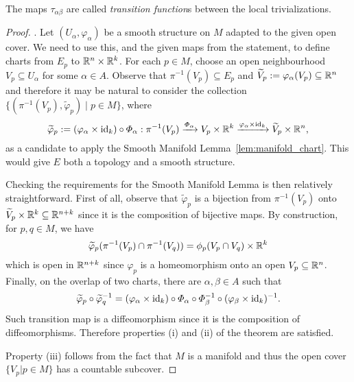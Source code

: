 The maps $\tau_{\alpha\beta}$ are called \emph{transition function}s between the local trivializations.
\begin{proof}
  .
  Let $(U_\alpha, \varphi_\alpha)$ be a smooth structure on $M$ adapted to the given open cover.
  We need to use this, and the given maps from the statement, to define charts from $E_p$ to $\mathbb{R}^n\times\mathbb{R}^k$.
  For each $p\in M$, choose an open neighbourhood $V_p \subseteq U_\alpha$ for some $\alpha\in A$.
  Observe that $\pi^{-1}(V_p) \subseteq E_p$ and $\widetilde{V}_p := \varphi_\alpha(V_p) \subseteq \mathbb{R}^n$ and therefore it may be natural to consider the collection $\{(\pi^{-1}(V_p), \widetilde{\varphi}_p)\mid p\in M\}$, where
  \begin{equation}
    \widetilde{\varphi}_p := (\varphi_\alpha\times \operatorname{id}_k) \circ \varPhi_\alpha : \pi^{-1}(V_p) \xrightarrow{\varPhi_\alpha} V_p\times\mathbb{R}^k \xrightarrow{\varphi_\alpha\times \operatorname{id}_k} \widetilde{V}_p\times \mathbb{R}^n,
  \end{equation}
  as a candidate to apply the Smooth Manifold Lemma~\ref{lem:manifold_chart}.
  This would give $E$ both a topology and a smooth structure.

  Checking the requirements for the Smooth Manifold Lemma is then relatively straightforward.
  First of all, observe that $\widetilde{\varphi}_p$ is a bijection from $\pi^{-1}(V_p)$ onto $\widetilde{V}_p\times\mathbb{R}^k \subseteq \mathbb{R}^{n+k}$ since it is the composition of bijective maps.
  By construction, for $p,q\in M$, we have
  \begin{equation}
    \widetilde{\varphi}_p(\pi^{-1}(V_p) \cap \pi^{-1}(V_q)) = \phi_p(V_p\cap V_q)\times \mathbb{R}^k
  \end{equation}
  which is open in $\mathbb{R}^{n+k}$ since $\varphi_p$ is a homeomorphism onto an open $V_p\subseteq\mathbb{R}^n$.
  Finally, on the overlap of two charts, there are $\alpha, \beta\in A$ such that
  \begin{equation}
    \widetilde{\varphi}_p \circ \widetilde{\varphi}_q^{-1} =
    (\varphi_\alpha \times \operatorname{id}_k) \circ \varPhi_\alpha \circ \varPhi_\beta^{-1} \circ (\varphi_\beta \times \operatorname{id}_k)^{-1}.
  \end{equation}
  Such transition map is a diffeomorphism since it is the composition of diffeomorphisms.
  Therefore properties (i) and (ii) of the theorem are satisfied.

  Property (iii) follows from the fact that $M$ is a manifold and thus the open cover $\{V_p | p \in M\}$ has a countable subcover.


\end{proof}
